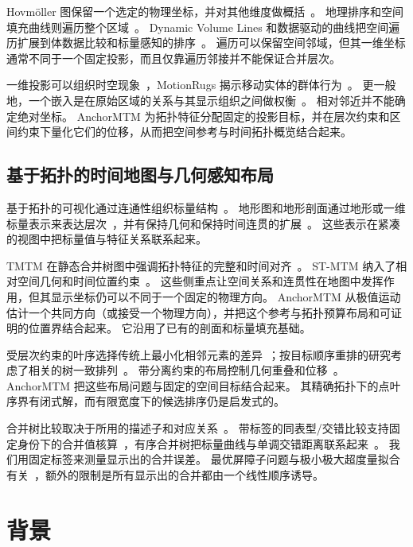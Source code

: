 \documentclass[fontset=none,zihao=5,a4paper]{ctexart}
\begin{document}
Hovmöller 图保留一个选定的物理坐标，并对其他维度做概括~\cite{Hovmoller:1949}。
地理排序和空间填充曲线则遍历整个区域~\cite{Guo:2006:SpatialOrder,Dafner:2000:CSFC}。
Dynamic Volume Lines 和数据驱动的曲线把空间遍历扩展到体数据比较和标量感知的排序~\cite{Weissenboeck:2019:DVL,Zhou:2021:DSF}。
遍历可以保留空间邻域，但其一维坐标通常不同于一个固定投影，而且仅靠遍历邻接并不能保证合并层次。

一维投影可以组织时空现象~\cite{Franke:2021:1DP}，MotionRugs 揭示移动实体的群体行为~\cite{Buchmueller:2019:MR}。
更一般地，一个嵌入是在原始区域的关系与其显示组织之间做权衡~\cite{Nonato:2019:MP}。
相对邻近并不能确定绝对坐标。
AnchorMTM 为拓扑特征分配固定的投影目标，并在层次约束和区间约束下量化它们的位移，从而把空间参考与时间拓扑概览结合起来。

\subsection{基于拓扑的时间地图与几何感知布局}
基于拓扑的可视化通过连通性组织标量结构~\cite{Heine:2016:Survey}。
地形图和地形剖面通过地形或一维标量表示来表达层次~\cite{Weber:2007:TL,Oesterling:2013:TLP}，并有保持几何和保持时间连贯的扩展~\cite{Beketayev:2012:GPTL,Herick:2020:TCTL}。
这些表示在紧凑的视图中把标量值与特征关系联系起来。

TMTM 在静态合并树图中强调拓扑特征的完整和时间对齐~\cite{Koepp:2023:TMTM}。
ST-MTM 纳入了相对空间几何和时间位置约束~\cite{STMTM:2026}。
这些侧重点让空间关系和连贯性在地图中发挥作用，但其显示坐标仍可以不同于一个固定的物理方向。
AnchorMTM 从极值运动估计一个共同方向（或接受一个物理方向），并把这个参考与拓扑预算布局和可证明的位置界结合起来。
它沿用了已有的剖面和标量填充基础。

受层次约束的叶序选择传统上最小化相邻元素的差异~\cite{BarJoseph:2001:OLO}；按目标顺序重排的研究考虑了相关的树一致排列~\cite{Bulteau:2022:RT}。
带分离约束的布局控制几何重叠和位移~\cite{Dwyer:2006:IPSEP,Li:2019:SOI}。
AnchorMTM 把这些布局问题与固定的空间目标结合起来。
其精确拓扑下的点叶序界有闭式解，而有限宽度下的候选排序仍是启发式的。

合并树比较取决于所用的描述子和对应关系~\cite{Yan:2021:Survey}。
带标签的同表型/交错比较支持固定身份下的合并值核算~\cite{Munch:2019:LINF,Gasparovic:2024:IID}，有序合并树把标量曲线与单调交错距离联系起来~\cite{Beurskens:2025:OMT}。
我们用固定标签来测量显示出的合并误差。
最优屏障子问题与极小极大超度量拟合有关~\cite{Farach:1995:RM}，额外的限制是所有显示出的合并都由一个线性顺序诱导。

\section{背景}\label{sec:background}
\end{document}

